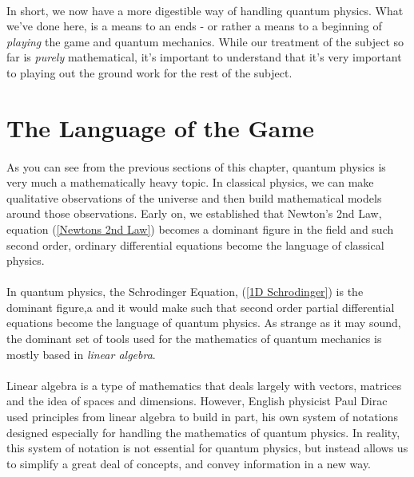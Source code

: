 \documentclass[12pt,letterpaper]{book}
\begin{document}
\paragraph*{}In short, we now have a more digestible way of handling quantum physics. What we've done here, is a means to an ends - or rather a means to a beginning of \textit{playing} the game and quantum mechanics. While our treatment of the subject so far is \textit{purely} mathematical, it's important to understand that it's very important to playing out the ground work for the rest of the subject. 


\section{The Language of the Game}
\paragraph*{}As you can see from the previous sections of this chapter, quantum physics is very much a mathematically heavy topic. In classical physics, we can make qualitative observations of the universe and then build mathematical models around those observations. Early on, we established that Newton's 2nd Law, equation (\ref{Newtons 2nd Law}) becomes a dominant figure in the field and such second order, ordinary differential equations become the language of classical physics.
\paragraph*{}In quantum physics, the Schrodinger Equation, (\ref{1D Schrodinger}) is the dominant figure,a and it would make such that second order partial differential equations become the language of quantum physics. As strange as it may sound, the dominant set of tools used for the mathematics of quantum mechanics is mostly based in \textit{linear algebra}.
\paragraph*{}Linear algebra is a type of mathematics that deals largely with vectors, matrices and the idea of spaces and dimensions. However, English physicist Paul Dirac used principles from linear algebra to build in part, his own system of notations designed especially for handling the mathematics of quantum physics. In reality, this system of notation is not essential for quantum physics, but instead allows us to simplify a great deal of concepts, and convey information in a new way.
\end{document}
